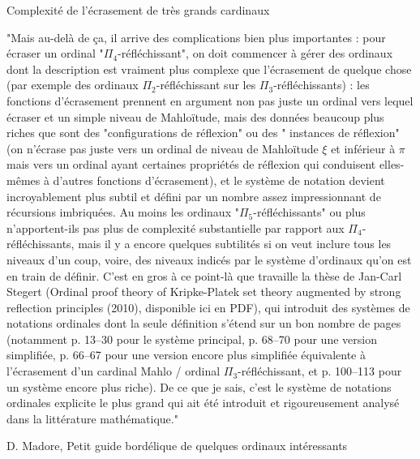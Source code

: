 \documentclass[12pt]{beamer}
\begin{document}
\begin{frame}
Complexité de l'écrasement de très grands cardinaux

\medskip

\scriptsize

"Mais au-delà de ça, il arrive des complications bien plus importantes : pour écraser un ordinal "$\Pi_4$-réfléchissant", on doit commencer à gérer des ordinaux dont la description est vraiment plus complexe que l'écrasement de quelque chose (par exemple des ordinaux $\Pi_2$-réfléchissant sur les $\Pi_3$-réfléchissants) : les fonctions d'écrasement prennent en argument non pas juste un ordinal vers lequel écraser et un simple niveau de Mahloïtude, mais des données beaucoup plus riches que sont des "configurations de réflexion" ou des " instances de réflexion" (on n'écrase pas juste vers un ordinal de niveau de Mahloïtude $\xi$ et inférieur à $\pi$ mais vers un ordinal ayant certaines propriétés de réflexion qui conduisent elles-mêmes à d'autres fonctions d'écrasement), et le système de notation devient incroyablement plus subtil et défini par un nombre assez impressionnant de récursions imbriquées. Au moins les ordinaux "$\Pi_5$-réfléchissants" ou plus n'apportent-ils pas plus de complexité substantielle par rapport aux $\Pi_4$-réfléchissants, mais il y a encore quelques subtilités si on veut inclure tous les niveaux d'un coup, voire, des niveaux indicés par le système d'ordinaux qu'on est en train de définir. C'est en gros à ce point-là que travaille la thèse de Jan-Carl Stegert (Ordinal proof theory of Kripke-Platek set theory augmented by strong reflection principles (2010), disponible ici en PDF), qui introduit des systèmes de notations ordinales dont la seule définition s'étend sur un bon nombre de pages (notamment p. 13–30 pour le système principal, p. 68–70 pour une version simplifiée, p. 66–67 pour une version encore plus simplifiée équivalente à l'écrasement d'un cardinal Mahlo / ordinal $\Pi_3$-réfléchissant, et p. 100–113 pour un système encore plus riche). De ce que je sais, c'est le système de notations ordinales explicite le plus grand qui ait été introduit et rigoureusement analysé dans la littérature mathématique."

\medskip

\footnotesize

D. Madore, Petit guide bordélique de quelques ordinaux intéressants

\end{frame}
\end{document}

